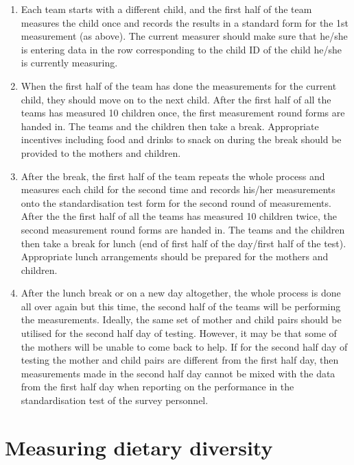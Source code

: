 \documentclass[12pt,]{book}
\theoremstyle{definition}
\theoremstyle{definition}
\theoremstyle{definition}
\theoremstyle{remark}
\begin{document}
\begin{enumerate}
\def\labelenumi{\arabic{enumi}.}
\setcounter{enumi}{1}
\item
  Each team starts with a different child, and the first half of the
  team measures the child once and records the results in a standard
  form for the 1st measurement (as above). The current measurer should
  make sure that he/she is entering data in the row corresponding to the
  child ID of the child he/she is currently measuring.
\item
  When the first half of the team has done the measurements for the
  current child, they should move on to the next child. After the first
  half of all the teams has measured 10 children once, the first
  measurement round forms are handed in. The teams and the children then
  take a break. Appropriate incentives including food and drinks to
  snack on during the break should be provided to the mothers and
  children.
\item
  After the break, the first half of the team repeats the whole process
  and measures each child for the second time and records his/her
  measurements onto the standardisation test form for the second round
  of measurements. After the the first half of all the teams has
  measured 10 children twice, the second measurement round forms are
  handed in. The teams and the children then take a break for lunch (end
  of first half of the day/first half of the test). Appropriate lunch
  arrangements should be prepared for the mothers and children.
\item
  After the lunch break or on a new day altogether, the whole process is
  done all over again but this time, the second half of the teams will
  be performing the measurements. Ideally, the same set of mother and
  child pairs should be utilised for the second half day of testing.
  However, it may be that some of the mothers will be unable to come
  back to help. If for the second half day of testing the mother and
  child pairs are different from the first half day, then measurements
  made in the second half day cannot be mixed with the data from the
  first half day when reporting on the performance in the
  standardisation test of the survey personnel.
\end{enumerate}

\hypertarget{diet}{%
\chapter{Measuring dietary diversity}\label{diet}}
\end{document}
